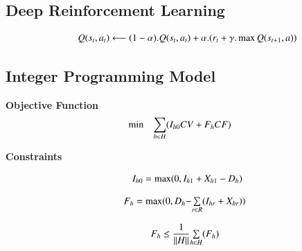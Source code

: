 \documentclass{paper}
\begin{document}
\subsection{Deep Reinforcement Learning}


\begin{equation}
	\begin{array}{ll@{}ll}
	& \displaystyle Q(s_{t},a_{t}) \longleftarrow  (1 - \alpha ).Q(s_{t},a_{t}) + \alpha .(r_{t} + \gamma . \max Q(s_{t+1},a))\\
	\end{array}
	\label{eq:Eq32}
	\end{equation}	
		



\subsection{Integer Programming Model}

		
	\textbf{Objective Function}
	\begin{equation}
	\begin{array}{ll@{}ll}
	\min  & \displaystyle\sum\limits_{h \in H}&(I_{h0}CV + F_{h}CF)\\
	\end{array}
	\label{eq:Eq31}
	\end{equation}

	\textbf{Constraints}
	
	\begin{equation}
	\begin{array}{ll@{}ll}
	& \displaystyle I_{h0} = \max(0, I_{h1} + X_{h1} - D_{h})\\
	\end{array}
	\label{eq:Eq32}
	\end{equation}	
		
	\begin{equation}
	\begin{array}{ll@{}ll}
	& \displaystyle F_{h} = \max(0, D_{h} - &\sum\limits_{r \in R}(I_{hr} + X_{hr}))\\
	\end{array}
	\label{eq:Eq33}	
	\end{equation}
	
	\begin{equation}
	\begin{array}{ll@{}ll}
	& \displaystyle F_{h} \leq \frac{1}{\| H \|} &\sum\limits_{h \in H}(F_{h})\\
	\end{array}
	\label{eq:Eq33}	
	\end{equation}
	
\end{document}
